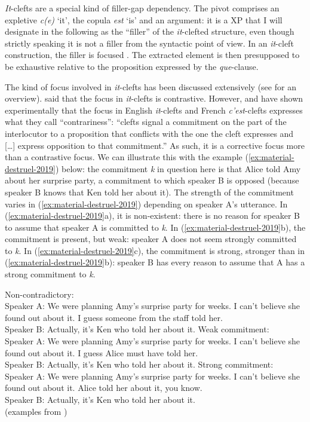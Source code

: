 \emph{It}-clefts are a special kind of filler-gap dependency. The pivot comprises an expletive \emph{c(e)} `it', the copula \emph{est} `is' and an argument: it is a XP that I will designate in the following as the ``filler'' of the \emph{it}-clefted structure, even though strictly speaking it is not a filler from the syntactic point of view. In an \emph{it}-cleft construction, the filler is focused \citep{Lambrecht.1994}. 
The extracted element is then presupposed to be exhaustive relative to the proposition expressed by the \emph{que}-clause.

The kind of focus involved in \emph{it}-clefts has been discussed extensively (see \citet{Destruel.2019} for an overview). \citet{Prince.1978} said that the focus in \emph{it}-clefts is contrastive. However, \citet{Destruel.2012} and \citet{Destruel.2019} have shown experimentally that the focus in English \emph{it}-clefts and French \emph{c'est}-clefts expresses what they call ``contrariness'': ``clefts signal a commitment on the part of the interlocutor to a proposition that conflicts with the one the cleft expresses and [\dots] express opposition to that commitment.'' As such, it is a corrective focus more than a contrastive focus. We can illustrate this with the example (\ref{ex:material-destruel-2019}) below: the commitment \emph{k} in question here is that Alice told Amy about her surprise party, a commitment to which speaker B is opposed (because speaker B knows that Ken told her about it). The strength of the commitment varies in (\ref{ex:material-destruel-2019}) depending on speaker A's utterance. In (\ref{ex:material-destruel-2019}a), it is non-existent: there is no reason for speaker B to assume that speaker A is committed to \emph{k}. In (\ref{ex:material-destruel-2019}b), the commitment is present, but weak: speaker A does not seem strongly committed to \emph{k}. In (\ref{ex:material-destruel-2019}c), the commitment is strong, stronger than in (\ref{ex:material-destruel-2019}b): speaker B has every reason to assume that A has a strong commitment to \emph{k}.\largerpage

\eal\label{ex:material-destruel-2019}
\ex Non-contradictory:\\
Speaker A: We were planning Amy's surprise party for weeks. I can't believe she found out about it. I guess someone from the staff told her.\\
Speaker B: Actually, it's Ken who told her about it.
\ex Weak commitment:\\
Speaker A: We were planning Amy's surprise party for weeks. I can't believe she found out about it. I guess Alice must have told her.\\
Speaker B: Actually, it's Ken who told her about it.
\ex Strong commitment:\\
Speaker A: We were planning Amy's surprise party for weeks. I can't believe she found out about it. Alice told her about it, you know.\\
Speaker B: Actually, it's Ken who told her about it.\\
(examples from \citealt[5]{Destruel.2019})
\zl 

